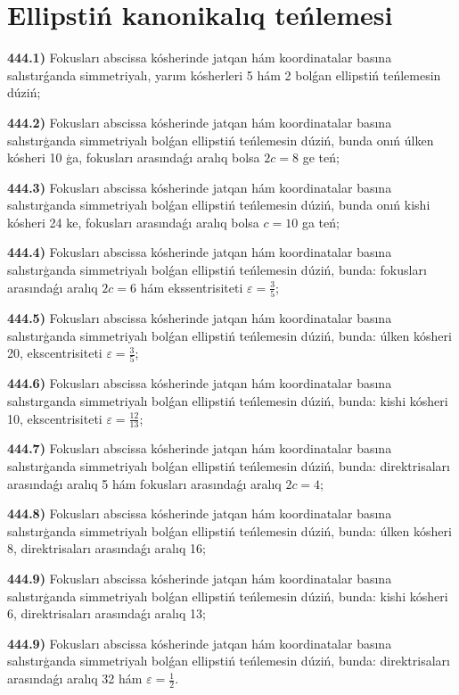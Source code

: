 \section{ Ellipstiń kanonikalıq teńlemesi}

\textbf{444.1)} Fokusları abscissa kósherinde jatqan hám koordinatalar basına salıstırǵanda simmetriyalı, yarım kósherleri 5 hám 2 bolǵan ellipstiń teńlemesin dúziń;

\textbf{444.2)} Fokusları abscissa kósherinde jatqan hám koordinatalar basına salıstırģanda simmetriyalı bolǵan ellipstiń teńlemesin dúziń, bunda onıń úlken kósheri 10 ģa, fokusları arasındaǵı aralıq bolsa $2c = 8$ ge teń;

\textbf{444.3)} Fokusları abscissa kósherinde jatqan hám koordinatalar basına salıstırģanda simmetriyalı bolǵan ellipstiń teńlemesin dúziń, bunda onıń kishi kósheri 24 ke, fokusları arasındaǵı aralıq bolsa $c = 10$ ga teń;

\textbf{444.4)} Fokusları abscissa kósherinde jatqan hám koordinatalar basına salıstırģanda simmetriyalı bolǵan ellipstiń teńlemesin dúziń, bunda: fokusları arasındaǵı aralıq $2 c=6$ hám ekssentrisiteti $\varepsilon=\frac{3}{5}$;

\textbf{444.5)} Fokusları abscissa kósherinde jatqan hám koordinatalar basına salıstırģanda simmetriyalı bolǵan ellipstiń teńlemesin dúziń, bunda: úlken kósheri 20, ekscentrisiteti $\varepsilon=\frac{3}{5}$;

\textbf{444.6)} Fokusları abscissa kósherinde jatqan hám koordinatalar basına salıstırganda simmetriyalı bolǵan ellipstiń teńlemesin dúziń, bunda: kishi kósheri 10, ekscentrisiteti $\varepsilon=\frac{12}{13}$;

\textbf{444.7)} Fokusları abscissa kósherinde jatqan hám koordinatalar basına salıstırģanda simmetriyalı bolǵan ellipstiń teńlemesin dúziń, bunda: direktrisaları arasındaǵı aralıq 5 hám fokusları arasındaǵı aralıq $2c=4$;

\textbf{444.8)} Fokusları abscissa kósherinde jatqan hám koordinatalar basına salıstırģanda simmetriyalı bolǵan ellipstiń teńlemesin dúziń, bunda: úlken kósheri 8, direktrisaları arasındaǵı aralıq 16;

\textbf{444.9)} Fokusları abscissa kósherinde jatqan hám koordinatalar basına salıstırģanda simmetriyalı bolǵan ellipstiń teńlemesin dúziń, bunda: kishi kósheri 6, direktrisaları arasındaǵı aralıq 13;

\textbf{444.9)} Fokusları abscissa kósherinde jatqan hám koordinatalar basına salıstırģanda simmetriyalı bolǵan ellipstiń teńlemesin dúziń, bunda: direktrisaları arasındaǵı aralıq 32 hám $\varepsilon=\frac{1}{2}$.

